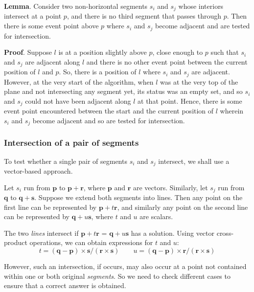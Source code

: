\documentclass{article}
\begin{document}
\textbf{Lemma}. Consider two non-horizontal segments $s_i$ and $s_j$ whose interiors intersect at a point $p$, and there is no third segment that passes through $p$. Then there is some event point above $p$ where $s_i$ and $s_j$ become adjacent and are tested for intersection.

\textbf{Proof}. Suppose $l$ is at a position slightly above $p$, close enough to $p$ such that $s_i$ and $s_j$ are adjacent along $l$ and there is no other event point between the current position of $l$ and $p$. So, there is a position of $l$ where $s_i$ and $s_j$ are adjacent. However, at the very start of the algorithm, when $l$ was at the very top of the plane and not intersecting any segment yet, its status was an empty set, and so $s_i$ and $s_j$ could not have been adjacent along $l$ at that point. Hence, there is some event point encountered between the start and the current position of $l$ wherein $s_i$ and $s_j$ become adjacent and so are tested for intersection.

\subsubsection{Intersection of a pair of segments}

To test whether a single pair of segments $s_i$ and $s_j$ intersect, we shall use a vector-based approach.

Let $s_i$ run from $\mathbf{p}$ to $\mathbf{p+r}$, where $\mathbf{p}$ and $\mathbf{r}$ are vectors. Similarly, let $s_j$ run from $\mathbf{q}$ to $\mathbf{q+s}$. Suppose we extend both segments into lines. Then any point on the first line can be represented by $\mathbf{p} + t\mathbf{r}$, and similarly any point on the second line can be represented by $\mathbf{q} + u\mathbf{s}$, where $t$ and $u$ are scalars.

The two \emph{lines} intersect if $\mathbf{p} + t\mathbf{r}$ = $\mathbf{q} + u\mathbf{s}$ has a solution. Using vector cross-product operations, we can obtain expressions for $t$ and $u$:
\begin{equation*}
    t = (\mathbf{q} - \mathbf{p}) \times \mathbf{s} / (\mathbf{r} \times \mathbf{s}) \hspace{2em} u = (\mathbf{q} - \mathbf{p}) \times \mathbf{r} / (\mathbf{r} \times \mathbf{s})
\end{equation*}

However, such an intersection, if occurs, may also occur at a point not contained within one or both original \emph{segments}. So we need to check different cases to ensure that a correct answer is obtained.
\end{document}
